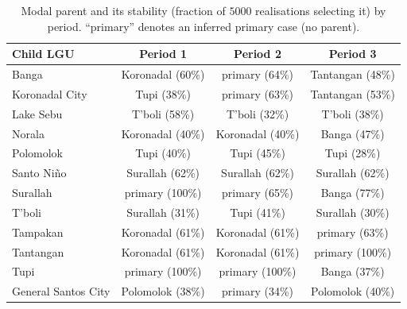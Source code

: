 \documentclass[a4paper,11pt]{article}
\begin{document}
\begin{table}[htbp]
\centering
\caption{Modal parent and its stability (fraction of $5000$ realisations selecting
it) by period. ``primary'' denotes an inferred primary case (no parent).}
\label{tab:stability}
\small
\begin{tabular}{lccc}
\toprule
\textbf{Child LGU} & \textbf{Period 1} & \textbf{Period 2} & \textbf{Period 3} \\
\midrule
Banga            & Koronadal (60\%)  & primary (64\%)    & Tantangan (48\%) \\
Koronadal City   & Tupi (38\%)       & primary (63\%)    & Tantangan (53\%) \\
Lake Sebu        & T'boli (58\%)     & T'boli (32\%)     & T'boli (38\%) \\
Norala           & Koronadal (40\%)  & Koronadal (40\%)  & Banga (47\%) \\
Polomolok        & Tupi (40\%)       & Tupi (45\%)       & Tupi (28\%) \\
Santo Ni\~{n}o   & Surallah (62\%)   & Surallah (62\%)   & Surallah (62\%) \\
Surallah         & primary (100\%)   & primary (65\%)    & Banga (77\%) \\
T'boli           & Surallah (31\%)   & Tupi (41\%)       & Surallah (30\%) \\
Tampakan         & Koronadal (61\%)  & Koronadal (61\%)  & primary (63\%) \\
Tantangan        & Koronadal (61\%)  & Koronadal (61\%)  & primary (100\%) \\
Tupi             & primary (100\%)   & primary (100\%)   & Banga (37\%) \\
General Santos City & Polomolok (38\%) & primary (34\%)  & Polomolok (40\%) \\
\bottomrule
\end{tabular}
\end{table}
\end{document}
